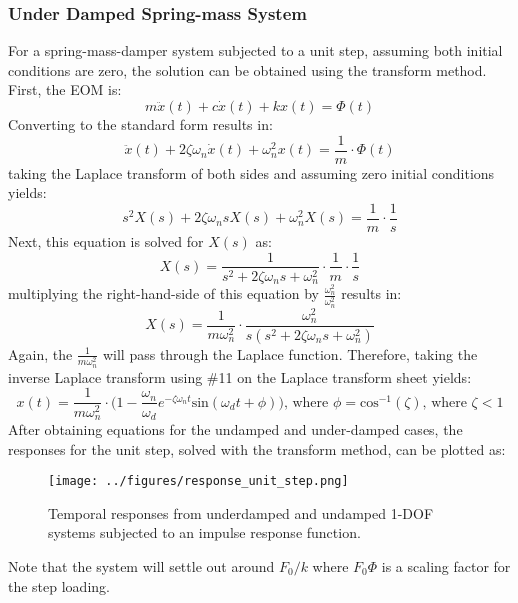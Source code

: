 \documentclass[12pt,letter]{article}
\begin{document}
\subsubsection{Under Damped Spring-mass System}

For a spring-mass-damper system subjected to a unit step, assuming both initial conditions are zero, the solution can be obtained using the transform method. First, the EOM is:
\begin{equation}
m\ddot{x}(t) + c\dot{x}(t) + kx(t) = \Phi(t)
\end{equation}
Converting to the standard form results in:
\begin{equation}
\ddot{x}(t) + 2  \zeta \omega_n\dot{x}(t) + \omega_n^2x(t) = \frac{1}{m} \cdot \Phi(t)
\end{equation}
taking the Laplace transform of both sides and assuming zero initial conditions yields:
\begin{equation}
	s^2X(s) + 2  \zeta \omega_n s X(s) + \omega_n^2 X(s)  =\frac{1}{m} \cdot \frac{1}{s}
\end{equation}
Next, this equation is solved for $X(s)$ as:
\begin{equation}
	X(s) = \frac{1}{s^2 + 2  \zeta \omega_n s + \omega_n^2} \cdot \frac{1}{m} \cdot \frac{1}{s}
\end{equation}
multiplying the right-hand-side of this equation by  $\frac{\omega_n^2}{\omega_n^2}$ results in:
\begin{equation}
	X(s) = \frac{1}{m \omega_n^2} \cdot \frac{\omega_n^2}{s(s^2+2\zeta\omega_n s+\omega_n^2)}
\end{equation}
Again, the $\frac{1}{m\omega_n^2}$ will pass through the Laplace function. Therefore, taking the inverse Laplace transform using \#11 on the Laplace transform sheet yields:
\begin{equation}
	x(t) = \frac{1}{m \omega_n^2} \cdot \Big(1 - \frac{\omega_n}{\omega_d}e^{-\zeta \omega_n t}\text{sin}(\omega_dt + \phi)\Big)\text{, where } \phi = \text{cos}^{-1}(\zeta)\text{, where } \zeta<1
\end{equation}
After obtaining equations for the undamped and under-damped cases, the responses for the unit step, solved with the transform method, can be plotted as:
\begin{figure}[H]
	\centering
	\texttt{[image: ../figures/response\_unit\_step.png]}
	\caption{Temporal responses from underdamped and undamped 1-DOF systems subjected to an impulse response function.}
\end{figure}
Note that the system will settle out around $F_0/k$ where $F_0  \Phi$ is a scaling factor for the step loading.
\end{document}
